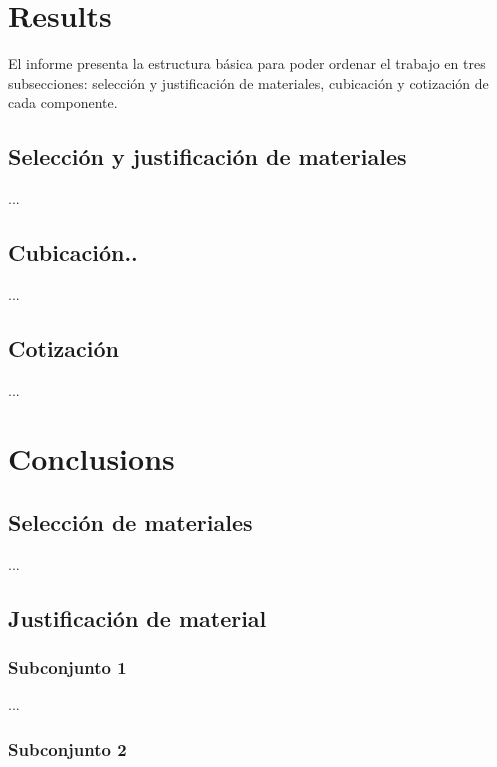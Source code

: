 \documentclass[12pt]{article}
\begin{document}
\newpage
\section{Results}

\qquad El informe presenta la estructura básica para poder ordenar el trabajo en tres subsecciones: selección y justificación de materiales, cubicación y cotización de cada componente. 

\subsection{Selección y justificación de materiales}

\qquad ...

\subsection{Cubicación..}

\qquad ...


\subsection{Cotización}

\qquad ...



\newpage
\section{Conclusions}
\subsection{Selección de materiales}

\qquad ... 

\newpage
\subsection{Justificación de material}

\subsubsection{Subconjunto 1}

\qquad ...

\subsubsection{Subconjunto 2}
\end{document}
